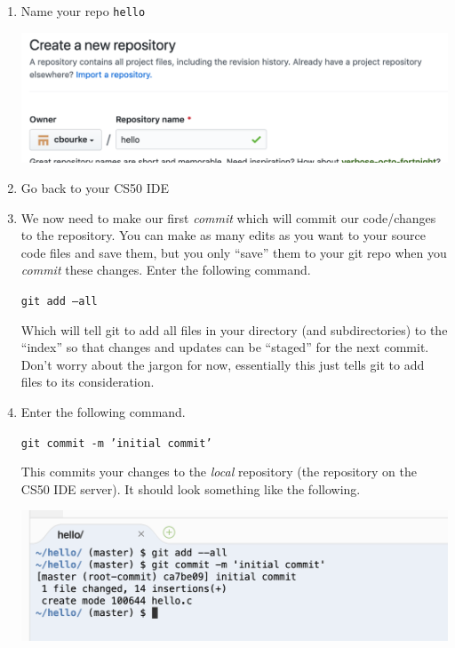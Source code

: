 \documentclass[12pt]{scrartcl}
\begin{document}
\begin{enumerate}
  \item Name your repo \texttt{hello}
  \begin{center}
  \includegraphics[scale=0.50]{./hack1.0-files/cl-githubNewRepoName.png}
  \end{center}

  \item Go back to your CS50 IDE
  
  \item We now need to make our first \emph{commit} which will commit
  our code/changes to the repository.  You can make as many edits as
  you want to your source code files and save them, but you only ``save''
  them to your git repo when you \emph{commit} these changes.  Enter
  the following command.
  
  \texttt{git add --all}
  
  Which will tell git to add all files in your directory 
  (and subdirectories) to the ``index'' so that changes and
  updates can be ``staged'' for the next commit.  Don't 
  worry about the jargon for now, essentially this just tells
  git to add files to its consideration.
  
  \item Enter the following command.

  \texttt{git commit -m 'initial commit'}
  
  This commits your changes to the \emph{local} repository
  (the repository on the CS50 IDE server).  It should look something
  like the following.
  
  \begin{center}
  \includegraphics[scale=0.50]{./hack1.0-files/cl-gitcommit}
  \end{center}


\end{enumerate}
\end{document}
